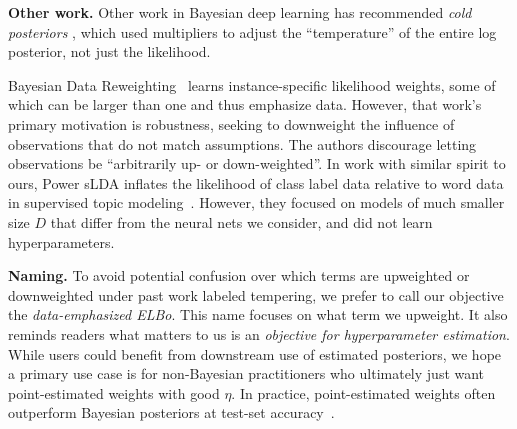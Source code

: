 \textbf{Other work.}
Other work in Bayesian deep learning has recommended \emph{cold posteriors} \citep{wenzel2020good, kapoor2022uncertainty}, which used multipliers to adjust the ``temperature'' of the entire log posterior, not just the likelihood.

Bayesian Data Reweighting~\citep{wang2017robust} learns instance-specific likelihood weights, some of which can be larger than one and thus emphasize data. However, that work's primary motivation is robustness, seeking to downweight the influence of observations that do not match assumptions. The authors discourage letting observations be ``arbitrarily up- or down-weighted''. In work with similar spirit to ours, Power sLDA inflates the likelihood of class label data relative to word data in supervised topic modeling~\citep{zhang2015supervise}. However, they 
focused on models of much smaller size $D$ that differ from the neural nets we consider, and did not learn hyperparameters.

\textbf{Naming.}
To avoid potential confusion over which terms are upweighted or downweighted under past work labeled tempering, we prefer to call our objective the \emph{data-emphasized ELBo}. This name focuses on what term we upweight. It also reminds readers what matters to us is an \emph{objective for hyperparameter estimation}. While users could benefit from downstream use of estimated posteriors, we hope a primary use case is for non-Bayesian practitioners who ultimately just want point-estimated weights with good $\eta$. In practice, point-estimated weights often outperform Bayesian posteriors at test-set accuracy~\citep{pitas2024fine}.